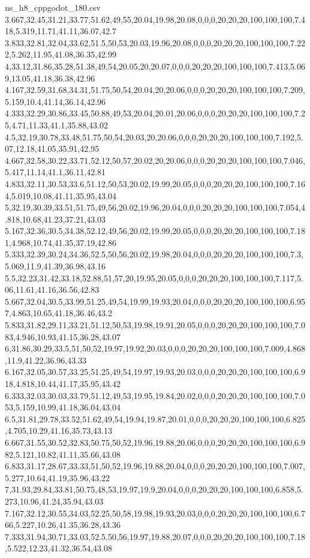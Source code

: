 \begin{filecontents*}[overwrite]{ns_h8_cppgodot_180.csv}
3.667,32.45,31.21,33.77,51.62,49,55,20.04,19.98,20.08,0,0,0,20,20,20,100,100,100,7.418,5.319,11.71,41.11,36.07,42.7
3.833,32.81,32.04,33.62,51.5,50,53,20.03,19.96,20.08,0,0,0,20,20,20,100,100,100,7.222,5.262,11.95,41.08,36.35,42.99
4,33.12,31.86,35.28,51.38,49,54,20.05,20,20.07,0,0,0,20,20,20,100,100,100,7.413,5.069,13.05,41.18,36.38,42.96
4.167,32.59,31.68,34.31,51.75,50,54,20.04,20,20.06,0,0,0,20,20,20,100,100,100,7.209,5.159,10.4,41.14,36.14,42.96
4.333,32.29,30.86,33.45,50.88,49,53,20.04,20.01,20.06,0,0,0,20,20,20,100,100,100,7.25,4.71,11.33,41.1,35.88,43.02
4.5,32.19,30.78,33.48,51.75,50,54,20.03,20,20.06,0,0,0,20,20,20,100,100,100,7.192,5.07,12.18,41.05,35.91,42.95
4.667,32.58,30.22,33.71,52.12,50,57,20.02,20,20.06,0,0,0,20,20,20,100,100,100,7.046,5.417,11.14,41.1,36.11,42.81
4.833,32.11,30.53,33.6,51.12,50,53,20.02,19.99,20.05,0,0,0,20,20,20,100,100,100,7.164,5.019,10.08,41.11,35.95,43.04
5,32.19,30.39,33.51,51.75,49,56,20.02,19.96,20.04,0,0,0,20,20,20,100,100,100,7.054,4.818,10.68,41.23,37.21,43.03
5.167,32.36,30.5,34.38,52.12,49,56,20.02,19.99,20.05,0,0,0,20,20,20,100,100,100,7.181,4.968,10.74,41.35,37.19,42.86
5.333,32.39,30.24,34.36,52.5,50,56,20.02,19.98,20.04,0,0,0,20,20,20,100,100,100,7.3,5.069,11.9,41.39,36.98,43.16
5.5,32.23,31.42,33.18,52.88,51,57,20,19.95,20.05,0,0,0,20,20,20,100,100,100,7.117,5.06,11.61,41.16,36.56,42.83
5.667,32.04,30.5,33.99,51.25,49,54,19.99,19.93,20.04,0,0,0,20,20,20,100,100,100,6.957,4.863,10.65,41.18,36.46,43.2
5.833,31.82,29.11,33.21,51.12,50,53,19.98,19.91,20.05,0,0,0,20,20,20,100,100,100,7.083,4.946,10.93,41.15,36.28,43.07
6,31.86,30.29,33.5,51,50,52,19.97,19.92,20.03,0,0,0,20,20,20,100,100,100,7.009,4.868,11.9,41.22,36.96,43.33
6.167,32.05,30.57,33.25,51.25,49,54,19.97,19.93,20.03,0,0,0,20,20,20,100,100,100,6.918,4.818,10.44,41.17,35.95,43.42
6.333,32.03,30.03,33.79,51.12,49,53,19.95,19.84,20.02,0,0,0,20,20,20,100,100,100,7.053,5.159,10.99,41.18,36.04,43.04
6.5,31.81,29.78,33.52,51.62,49,54,19.94,19.87,20.01,0,0,0,20,20,20,100,100,100,6.825,4.705,10.29,41.16,35.73,43.13
6.667,31.55,30.52,32.83,50.75,50,52,19.96,19.88,20.06,0,0,0,20,20,20,100,100,100,6.982,5.121,10.82,41.11,35.66,43.08
6.833,31.17,28.67,33.33,51,50,52,19.96,19.88,20.04,0,0,0,20,20,20,100,100,100,7.007,5.277,10.64,41.19,35.96,43.22
7,31.93,29.84,33.81,50.75,48,53,19.97,19.9,20.04,0,0,0,20,20,20,100,100,100,6.858,5.273,10.96,41.24,35.94,43.03
7.167,32.12,30.55,34.03,52.25,50,58,19.98,19.93,20.03,0,0,0,20,20,20,100,100,100,6.766,5.227,10.26,41.35,36.28,43.36
7.333,31.94,30.71,33.03,52.5,50,56,19.97,19.88,20.07,0,0,0,20,20,20,100,100,100,7.18,5.522,12.23,41.32,36.54,43.08

\end{filecontents*}
